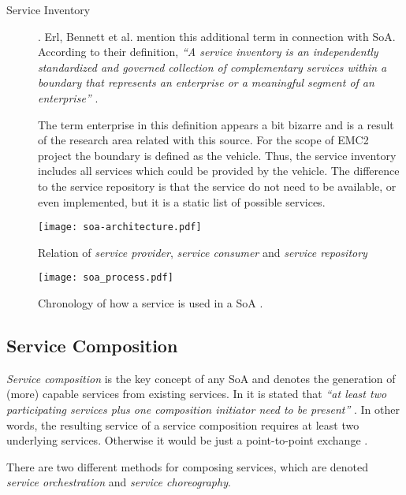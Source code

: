 \begin{description}
\item [Service Inventory] .
Erl, Bennett et al. mention this additional term in connection with SoA. According to their definition, \emph{``A service inventory is an independently standardized and governed collection of complementary services within a boundary that represents an enterprise or a meaningful segment of an enterprise''} \cite[p.41]{erl2011}. 

The term enterprise in this definition appears a bit bizarre and is a result of the research area related with this source. For the scope of EMC2 project the boundary is defined as the vehicle. Thus, the service inventory includes all services which could be provided by the vehicle. The difference to the service repository is that the service do not need to be available, or even implemented, but it is a static list of possible services.
\end{description}

\begin{figure}[ht]
\centering
\texttt{[image: soa-architecture.pdf]}
\caption{Relation of \emph{service provider}, \emph{service consumer} and \emph{service repository} \cite{arrowhead} \cite{converge}}
\label{fig:soa_overview}
\end{figure}

\begin{figure}[ht]
\centering
\texttt{[image: soa\_process.pdf]}
\caption{Chronology of how a service is used in a SoA \cite{converge}.}
\label{fig:service_cronology}
\end{figure}






\subsection{Service Composition}
\label{sec:service-composition}
\emph{Service composition} is the key concept of any SoA and denotes the generation of (more) capable services from existing services. In \cite{erl2011} it is stated that \emph{``at least two participating services plus one composition initiator need to be present''} \cite[p.40]{erl2011}. In other words, the resulting service of a service composition requires at least two underlying services. Otherwise it would be just a point-to-point exchange \cite[p.40]{erl2011}.

There are two different methods for composing services, which are denoted \emph{service orchestration} and \emph{service choreography}.

